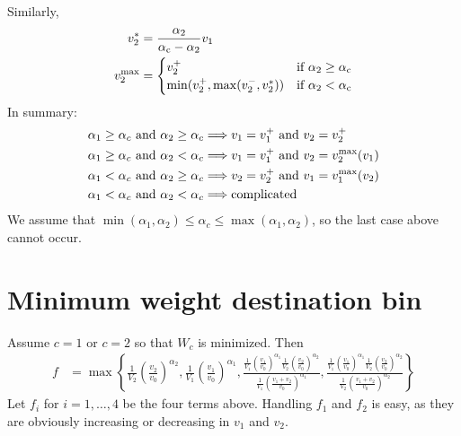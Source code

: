 \documentclass{article}
\begin{document}
Similarly,
\begin{align}
  v_2^* &= \frac{\alpha_2}{\alpha_{\rm c} - \alpha_2} v_1 \\
  v_2^{\rm max} &= \begin{cases}
    v_2^+ & \text{if } \alpha_2 \ge \alpha_{\rm c} \\
    \min(v_2^+, \max(v_2^-, v_2^*)) & \text{if } \alpha_2 < \alpha_{\rm c}
    \end{cases}
\end{align}
In summary:
\begin{align}
  \alpha_1 \ge \alpha_c \text{ and } \alpha_2 \ge \alpha_c
  &\Longrightarrow v_1 = v_1^+ \text{ and } v_2 = v_2^+ \\
  \alpha_1 \ge \alpha_c \text{ and } \alpha_2 < \alpha_c
  &\Longrightarrow v_1 = v_1^+ \text{ and } v_2 = v_2^{\rm max}(v_1) \\
  \alpha_1 < \alpha_c \text{ and } \alpha_2 \ge \alpha_c
  &\Longrightarrow v_2 = v_2^+ \text{ and } v_1 = v_1^{\rm max}(v_2)  \\
  \alpha_1 < \alpha_c \text{ and } \alpha_2 < \alpha_c
  &\Longrightarrow \text{complicated}
\end{align}
We assume that $\min(\alpha_1,\alpha_2) \le \alpha_c \le
\max(\alpha_1,\alpha_2)$, so the last case above cannot occur.

\section{Minimum weight destination bin}

Assume $c = 1$ or $c = 2$ so that $W_c$ is minimized. Then
\begin{align}
  f &= \max\left\{
    \frac{1}{V_2} \left(\frac{v_2}{v_0}\right)^{\alpha_2},
    \frac{1}{V_1} \left(\frac{v_1}{v_0}\right)^{\alpha_1},
    \frac{\frac{1}{V_1} \left(\frac{v_1}{v_0}\right)^{\alpha_1}
      \frac{1}{V_2} \left(\frac{v_2}{v_0}\right)^{\alpha_2}}{
      \frac{1}{V_1} \left(\frac{v_1 + v_2}{v_0}\right)^{\alpha_1}},
    \frac{\frac{1}{V_1} \left(\frac{v_1}{v_0}\right)^{\alpha_1}
      \frac{1}{V_2} \left(\frac{v_2}{v_0}\right)^{\alpha_2}}{
      \frac{1}{V_2} \left(\frac{v_1 + v_2}{v_0}\right)^{\alpha_2}}
  \right\}
\end{align}
Let $f_i$ for $i = 1,\ldots,4$ be the four terms above. Handling $f_1$
and $f_2$ is easy, as they are obviously increasing or decreasing in
$v_1$ and $v_2$.
\end{document}
